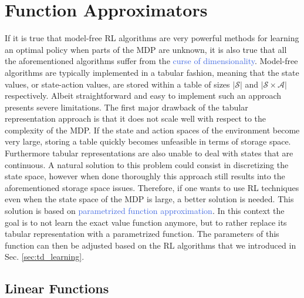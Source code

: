 \section{Function Approximators}
If it is true that model-free RL algorithms are very powerful methods for learning an optimal policy when parts of the MDP are unknown, it is also true that all the aforementioned algorithms suffer from the \textcolor{RoyalBlue}{curse of dimensionality}. Model-free algorithms are typically implemented in a tabular fashion, meaning that the state values, or state-action values, are stored within a table of sizes $|\mathcal{S}|$ and $|\mathcal{S}\times\mathcal{A}|$ respectively. Albeit straightforward and easy to implement such an approach presents severe limitations. The first major drawback of the tabular representation approach is that it does not scale well with respect to the complexity of the MDP. If the state and action spaces of the environment become very large, storing a table quickly becomes unfeasible in terms of storage space. Furthermore tabular representations are also unable to deal with states that are continuous. A natural solution to this problem could consist in discretizing the state space, however when done thoroughly this approach still results into the aforementioned storage space issues. Therefore, if one wants to use RL techniques even when the state space of the MDP is large, a better solution is needed. This solution is based on \textcolor{RoyalBlue}{parametrized function approximation}. In this context the goal is to not learn the exact value function anymore, but to rather replace its tabular representation with a parametrized function. The parameters of this function can then be adjusted based on the RL algorithms that we introduced in Sec. \ref{sec:td_learning}. 


\subsection{Linear Functions}
\label{sec:linear_functions}

